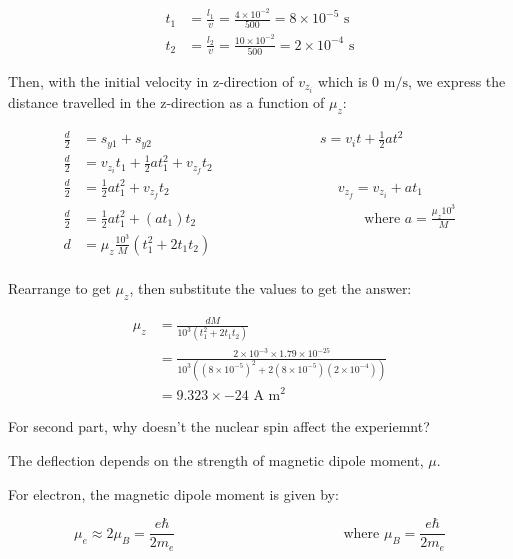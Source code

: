 \documentclass{article}
\begin{document}
\begin{align*}
  t_1 &= \frac{l_1}{v} = \frac{4 \times 10^{-2}}{500} = 8 \times 10^{-5} \text{ s} \\
  t_2 &= \frac{l_2}{v} = \frac{10 \times 10^{-2}}{500} = 2 \times 10^{-4} \text{ s}
\end{align*}

Then, with the initial velocity in z-direction of $v_{z_i}$ which is $0 \text{ m/s}$,
we express the distance travelled in the z-direction as a function of $\mu_z$:

\begin{align*}
  \frac{d}{2} &= s_{y1} + s_{y2} \hspace{2in}s = v_{i}t + \frac{1}{2}a t^2 \\
  \frac{d}{2} &= v_{z_i}t_1 + \frac{1}{2}a t_1^2 + v_{z_f}t_2\\
  \frac{d}{2} &= \frac{1}{2}a t_1^2 + v_{z_f}t_2 \hspace{2in} v_{z_f} = v_{z_i} + at_1 \\
  \frac{d}{2} &= \frac{1}{2}a t_1^2 + (at_1)t_2 \hspace{2in} \text{where } a = \frac{\mu_z 10^3}{M} \\
  d &= \mu_z \frac{10^3}{M} \left(t_1^2 + 2t_1t_2\right) \\
\end{align*}

Rearrange to get $\mu_z$, then substitute the values to get the answer:

\begin{align*}
  \mu_z &= \frac{dM}{10^3 \left(t_1^2 + 2t_1t_2\right)} \\
  &= \frac{2 \times 10^{-3} \times 1.79 \times 10^{-25}}{10^3 \left((8 \times 10^{-5})^2 + 2 (8\times10^{-5})(2 \times 10^{-4})\right)} \\
  &= 9.323 \times -24 \text{ A m}^2
\end{align*}

For second part, why doesn't the nuclear spin affect the experiemnt?

The deflection depends on the strength of magnetic dipole moment, $\mu$.

For electron, the magnetic dipole moment is given by:

\begin{equation}
  \mu_e \approx 2 \mu_B = \frac{e\hbar}{2m_e} \hspace{2in} \text{where } \mu_B = \frac{e\hbar}{2m_e}
\end{equation}
\end{document}
